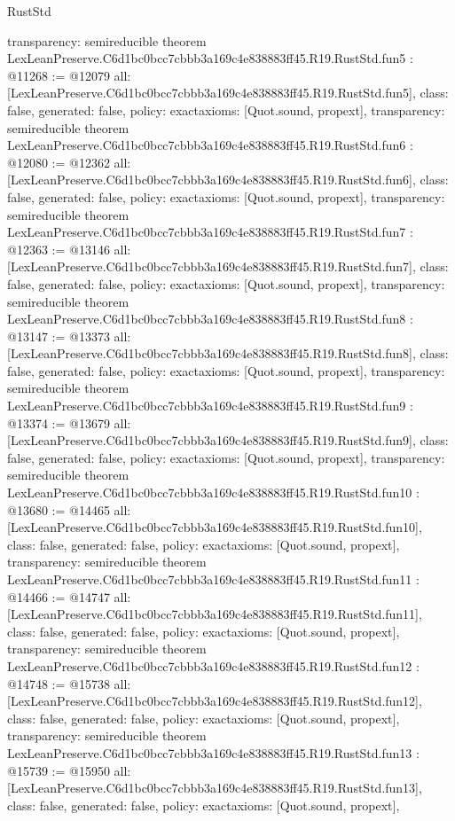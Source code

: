 \begin{lexlean}{RustStd}
\begin{coremodule}
{  transparency: semireducible
}
theorem LexLeanPreserve.C6d1bc0bcc7cbbb3a169c4e838883ff45.R19.RustStd.fun5 : @11268 := @12079 {
  all: [LexLeanPreserve.C6d1bc0bcc7cbbb3a169c4e838883ff45.R19.RustStd.fun5],
  class: false,
  generated: false,
  policy: exact{axioms: [Quot.sound, propext]},
  transparency: semireducible
}
theorem LexLeanPreserve.C6d1bc0bcc7cbbb3a169c4e838883ff45.R19.RustStd.fun6 : @12080 := @12362 {
  all: [LexLeanPreserve.C6d1bc0bcc7cbbb3a169c4e838883ff45.R19.RustStd.fun6],
  class: false,
  generated: false,
  policy: exact{axioms: [Quot.sound, propext]},
  transparency: semireducible
}
theorem LexLeanPreserve.C6d1bc0bcc7cbbb3a169c4e838883ff45.R19.RustStd.fun7 : @12363 := @13146 {
  all: [LexLeanPreserve.C6d1bc0bcc7cbbb3a169c4e838883ff45.R19.RustStd.fun7],
  class: false,
  generated: false,
  policy: exact{axioms: [Quot.sound, propext]},
  transparency: semireducible
}
theorem LexLeanPreserve.C6d1bc0bcc7cbbb3a169c4e838883ff45.R19.RustStd.fun8 : @13147 := @13373 {
  all: [LexLeanPreserve.C6d1bc0bcc7cbbb3a169c4e838883ff45.R19.RustStd.fun8],
  class: false,
  generated: false,
  policy: exact{axioms: [Quot.sound, propext]},
  transparency: semireducible
}
theorem LexLeanPreserve.C6d1bc0bcc7cbbb3a169c4e838883ff45.R19.RustStd.fun9 : @13374 := @13679 {
  all: [LexLeanPreserve.C6d1bc0bcc7cbbb3a169c4e838883ff45.R19.RustStd.fun9],
  class: false,
  generated: false,
  policy: exact{axioms: [Quot.sound, propext]},
  transparency: semireducible
}
theorem LexLeanPreserve.C6d1bc0bcc7cbbb3a169c4e838883ff45.R19.RustStd.fun10 : @13680 := @14465 {
  all: [LexLeanPreserve.C6d1bc0bcc7cbbb3a169c4e838883ff45.R19.RustStd.fun10],
  class: false,
  generated: false,
  policy: exact{axioms: [Quot.sound, propext]},
  transparency: semireducible
}
theorem LexLeanPreserve.C6d1bc0bcc7cbbb3a169c4e838883ff45.R19.RustStd.fun11 : @14466 := @14747 {
  all: [LexLeanPreserve.C6d1bc0bcc7cbbb3a169c4e838883ff45.R19.RustStd.fun11],
  class: false,
  generated: false,
  policy: exact{axioms: [Quot.sound, propext]},
  transparency: semireducible
}
theorem LexLeanPreserve.C6d1bc0bcc7cbbb3a169c4e838883ff45.R19.RustStd.fun12 : @14748 := @15738 {
  all: [LexLeanPreserve.C6d1bc0bcc7cbbb3a169c4e838883ff45.R19.RustStd.fun12],
  class: false,
  generated: false,
  policy: exact{axioms: [Quot.sound, propext]},
  transparency: semireducible
}
theorem LexLeanPreserve.C6d1bc0bcc7cbbb3a169c4e838883ff45.R19.RustStd.fun13 : @15739 := @15950 {
  all: [LexLeanPreserve.C6d1bc0bcc7cbbb3a169c4e838883ff45.R19.RustStd.fun13],
  class: false,
  generated: false,
  policy: exact{axioms: [Quot.sound, propext]},
}
\end{coremodule}
\end{lexlean}
